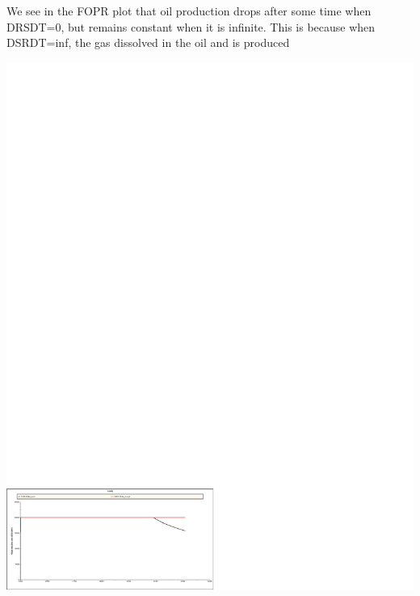 We see in the FOPR plot that oil production drops after some time when DRSDT=0, but remains constant when it is infinite. This is because when DSRDT=inf, the gas dissolved in the oil and is produced



\pagebreak
\centerline{\includegraphics[clip=true, trim=0cm 0cm 10.6cm 22.6cm,width=1.3\textwidth]{graphics/fopr_comb.pdf}}
